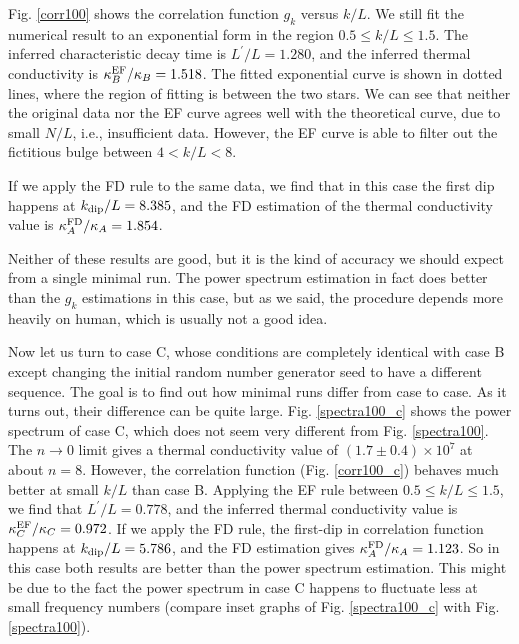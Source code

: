 Fig. \ref{corr100} shows the correlation function $g_k$ versus $k/L$.
We still fit the numerical result to an exponential form in the region
$0.5 \le k/L \le 1.5$. The inferred characteristic decay time is
$L^\prime / L = 1.280$, and the inferred thermal conductivity is
$\kappa_{B}^{\rm EF} / \kappa_B = 1.518$. The fitted exponential curve
is shown in dotted lines, where the region of fitting is between the
two stars. We can see that neither the original data nor the EF curve
agrees well with the theoretical curve, due to small $N/L$, i.e.,
insufficient data. However, the EF curve is able to filter out the
fictitious bulge between $4< k/L <8$.

If we apply the FD rule to the same data, we find that in this case
the first dip happens at $k_{\rm dip} / L = 8.385$, and the FD
estimation of the thermal conductivity value is $\kappa_{A}^{\rm FD} /
\kappa_A = 1.854$.

Neither of these results are good, but it is the kind of accuracy we
should expect from a single minimal run. The power spectrum estimation
in fact does better than the $g_k$ estimations in this case, but as we
said, the procedure depends more heavily on human, which is usually
not a good idea.

Now let us turn to case C, whose conditions are completely identical
with case B except changing the initial random number generator seed
to have a different sequence.  The goal is to find out how minimal
runs differ from case to case.  As it turns out, their difference can
be quite large. Fig. \ref{spectra100_c} shows the power spectrum of
case C, which does not seem very different from Fig.
\ref{spectra100}.  The $n\rightarrow 0$ limit gives a thermal
conductivity value of $(1.7 \pm 0.4) \times 10^7$ at about $n=8$.
However, the correlation function (Fig. \ref{corr100_c}) behaves much
better at small $k/L$ than case B. Applying the EF rule between $0.5
\le k/L \le 1.5$, we find that $L^\prime/L = 0.778$, and the inferred
thermal conductivity value is $\kappa_{C}^{\rm EF} / \kappa_C =
0.972$. If we apply the FD rule, the first-dip in correlation function
happens at $k_{\rm dip} / L = 5.786$, and the FD estimation gives
$\kappa_{A}^{\rm FD} / \kappa_A = 1.123$. So in this case both results
are better than the power spectrum estimation.  This might be due to
the fact the power spectrum in case C happens to fluctuate less at
small frequency numbers (compare inset graphs of Fig.
\ref{spectra100_c} with Fig.  \ref{spectra100}).

